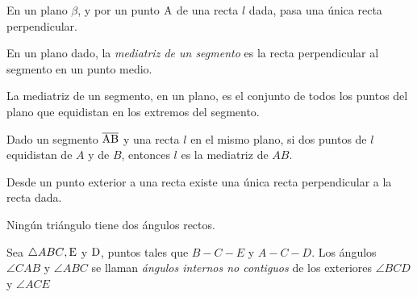 \begin{theorem}
    En un plano $\beta$, y por un punto $\rm A$ de una recta $l$ dada, pasa una única recta perpendicular.
\end{theorem}

\begin{definition}
    En un plano dado, la \textit{mediatriz de un segmento} es la recta perpendicular al segmento en un punto medio.

    \begin{figure}[!h]
        \centering
        
        \label{fig:bisector}
    \end{figure}
    
\end{definition}

\begin{theorem}
    La mediatriz de un segmento, en un plano, es el conjunto de todos los puntos del plano que equidistan en los extremos del segmento.
\end{theorem}

\begin{theorem}
    Dado un segmento $\overline{\rm AB}$ y una recta $l$ en el mismo plano, si dos puntos de $l$ equidistan de $A$ y de $B$, entonces $l$ es la mediatriz de $AB$.
\end{theorem}

\begin{theorem}
    Desde un punto exterior a una recta existe una única recta perpendicular a la recta dada.
\end{theorem}

\begin{theorem}
    Ningún triángulo tiene dos ángulos rectos.
\end{theorem}

\begin{definition}

Sea $\triangle{ABC}, \rm E$ y $\rm D$, puntos tales que $B-C-E$ y $A-C-D$. Los ángulos $\angle{CAB}$ y $\angle{ABC}$ se llaman \textit{ángulos internos no contiguos} de los exteriores $\angle{BCD}$ y $\angle{ACE}$

    \begin{figure}[!h]
        \centering
        
        \label{fig:intext-angles}
    \end{figure}
    
\end{definition}

